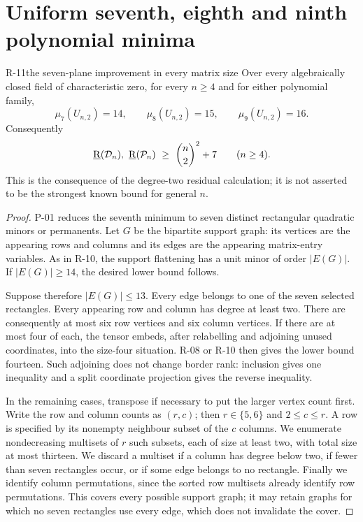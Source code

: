 \section{Uniform seventh, eighth and ninth polynomial minima}

\begin{finding}{R-11}{the seven-plane improvement in every matrix size}
Over every algebraically closed field of characteristic zero,
for every $n\geq4$ and for either polynomial family,
\[
 \mu_7(U_{n,2})=14,\qquad
 \mu_8(U_{n,2})=15,\qquad
 \mu_9(U_{n,2})=16.
\]
Consequently
\[
 \underline{\mathrm R}(\mathcal D_n),\ \underline{\mathrm R}(\mathcal P_n)
 \ \geq\ \binom n2^2+7\qquad(n\geq4).
\]
This is the consequence of the degree-two residual calculation;
it is not asserted to be the strongest known bound for general $n$.
\end{finding}
\begin{proof}
P-01 reduces the seventh minimum to seven distinct rectangular
quadratic minors or permanents. Let $G$ be the bipartite support
graph: its vertices are the appearing rows and columns and its
edges are the appearing matrix-entry variables. As in R-10,
the support flattening has a unit minor of order $|E(G)|$.
If $|E(G)|\geq14$, the desired lower bound follows.

Suppose therefore $|E(G)|\leq13$. Every edge belongs to one of
the seven selected rectangles. Every appearing row and column
has degree at least two. There are consequently at most six
row vertices and six column vertices. If there are at most four
of each, the tensor embeds, after relabelling and adjoining
unused coordinates, into the size-four situation. R-08 or R-10
then gives the lower bound fourteen. Such adjoining does not
change border rank: inclusion gives one inequality and a split
coordinate projection gives the reverse inequality.

In the remaining cases, transpose if necessary to put the larger
vertex count first. Write the row and column counts as $(r,c)$;
then $r\in\{5,6\}$ and $2\leq c\leq r$. A row is specified by
its nonempty neighbour subset of the $c$ columns. We enumerate
nondecreasing multisets of $r$ such subsets, each of size at
least two, with total size at most thirteen. We discard a
multiset if a column has degree below two, if fewer than seven
rectangles occur, or if some edge belongs to no rectangle.
Finally we identify column permutations, since the sorted row
multisets already identify row permutations. This covers every
possible support graph; it may retain graphs for which no
seven rectangles use every edge, which does not invalidate
the cover.


\end{proof}
